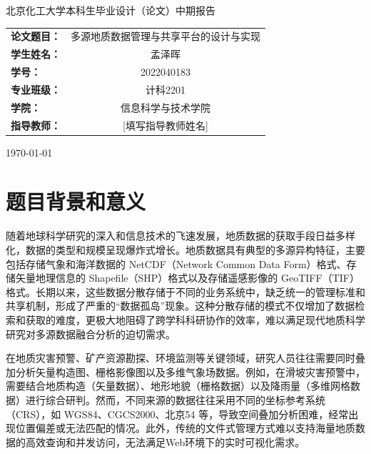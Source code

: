 \documentclass[a4paper,12pt]{ctexart}
\newcommand{\xiaosi}{\fontsize{12pt}{22pt}\selectfont} %
\begin{document}
\begin{titlepage}
    \centering
    \vspace*{2cm}
    
    {\heiti 北京化工大学本科生毕业设计（论文）中期报告 \par}
    
    \vspace{5cm}
    
    {\songti
    \renewcommand{\arraystretch}{2}
    \begin{tabular}{lc}
        \textbf{论文题目：} & 多源地质数据管理与共享平台的设计与实现 \\
        \textbf{学生姓名：} & 孟泽晖 \\
        \textbf{学号：} & 2022040183 \\
        \textbf{专业班级：} & 计科2201 \\
        \textbf{学院：} & 信息科学与技术学院 \\
        \textbf{指导教师：} & [填写指导教师姓名] \\
    \end{tabular}
    }
    
    \vfill
    
    {\songti \today \par}
    \vspace{2cm}
\end{titlepage}

\newpage
{}
\setcounter{page}{1}

\xiaosi
\songti

\section{题目背景和意义}

随着地球科学研究的深入和信息技术的飞速发展，地质数据的获取手段日益多样化，数据的类型和规模呈现爆炸式增长。地质数据具有典型的多源异构特征，主要包括存储气象和海洋数据的 NetCDF（Network Common Data Form）格式、存储矢量地理信息的 Shapefile（SHP）格式以及存储遥感影像的 GeoTIFF（TIF）格式。长期以来，这些数据分散存储于不同的业务系统中，缺乏统一的管理标准和共享机制，形成了严重的“数据孤岛”现象。这种分散存储的模式不仅增加了数据检索和获取的难度，更极大地阻碍了跨学科科研协作的效率，难以满足现代地质科学研究对多源数据融合分析的迫切需求。

在地质灾害预警、矿产资源勘探、环境监测等关键领域，研究人员往往需要同时叠加分析矢量构造图、栅格影像图以及多维气象场数据。例如，在滑坡灾害预警中，需要结合地质构造（矢量数据）、地形地貌（栅格数据）以及降雨量（多维网格数据）进行综合研判。然而，不同来源的数据往往采用不同的坐标参考系统（CRS），如 WGS84、CGCS2000、北京54 等，导致空间叠加分析困难，经常出现位置偏差或无法匹配的情况。此外，传统的文件式管理方式难以支持海量地质数据的高效查询和并发访问，无法满足Web环境下的实时可视化需求。
\end{document}
